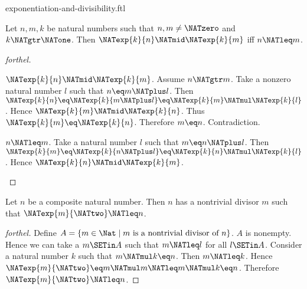 \documentclass{stex}
\begin{document}
\begin{smodule}{exponentiation-and-divisibility.ftl}

\begin{proposition}[forthel,id=ARITHMETIC_13_8426075493236736]
  Let $n, m, k$ be natural numbers such that $n, m \neq \NATzero$ and $k \NATgtr \NATone$.
  Then $\NATexp{k}{n} \NATmid \NATexp{k}{m}$ iff $n \NATleq m$.
\end{proposition}
\begin{proof}[forthel]
  \begin{case}{$\NATexp{k}{n} \NATmid \NATexp{k}{m}$.}
    Assume $n \NATgtr m$.
    Take a nonzero natural number $l$ such that $n \eq m \NATplus l$.
    Then $\NATexp{k}{n}
      \eq \NATexp{k}{m \NATplus l}
      \eq \NATexp{k}{m} \NATmul \NATexp{k}{l}$.
    Hence $\NATexp{k}{m} \NATmid \NATexp{k}{n}$.
    Thus $\NATexp{k}{m} \eq \NATexp{k}{n}$.
    Therefore $m \eq n$.
    Contradiction.
  \end{case}

  \begin{case}{$n \NATleq m$.}
    Take a natural number $l$ such that $m \eq n \NATplus l$.
    Then $\NATexp{k}{m}
      \eq \NATexp{k}{n \NATplus l}
      \eq \NATexp{k}{n} \NATmul \NATexp{k}{l}$.
    Hence $\NATexp{k}{n} \NATmid \NATexp{k}{m}$.
  \end{case}
\end{proof}

\begin{proposition}[forthel,id=ARITHMETIC_13_797196163219456]
  Let $n$ be a composite natural number.
  Then $n$ has a nontrivial divisor $m$ such that $\NATexp{m}{\NATtwo} \NATleq n$.
\end{proposition}
\begin{proof}[forthel]
  Define $A = \{ m \in \Nat \mid m\text{ is a nontrivial divisor of }n \}$.
  $A$ is nonempty.
  Hence we can take a $m \SETin A$ such that $m \NATleq l$ for all $l \SETin A$.
  Consider a natural number $k$ such that $m \NATmul k \eq n$.
  Then $m \NATleq k$.
  Hence $\NATexp{m}{\NATtwo} \eq m \NATmul m \NATleq m \NATmul k \eq n$.
  Therefore $\NATexp{m}{\NATtwo} \NATleq n$.
\end{proof}
\end{smodule}
\end{document}
